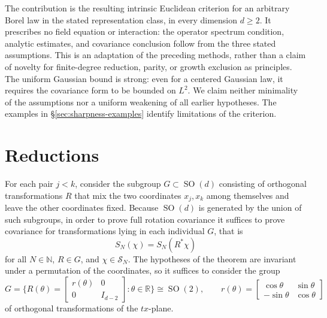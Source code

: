\documentclass[11pt, letterpaper, reqno]{amsart}
\theoremstyle{definition}
\theoremstyle{remark}
\newcommand{\bbN}{\mathbb{N}}
\newcommand{\bbR}{\mathbb{R}}
\newcommand{\calS}{\mathcal{S}}
\begin{document}
The contribution is the resulting intrinsic Euclidean criterion for an
arbitrary Borel law in the stated representation class, in every dimension
$d\geq2$. It prescribes no field equation or interaction: the operator
spectrum condition, analytic estimates, and covariance conclusion follow
from the three stated assumptions. This is an adaptation of the preceding
methods, rather than a claim of novelty for finite-degree reduction,
parity, or growth exclusion as principles. The uniform Gaussian bound is
strong: even for a centered Gaussian law, it requires the covariance form
to be bounded on $L^2$. We claim neither minimality of the assumptions nor
a uniform weakening of all earlier hypotheses. The examples in
\S\ref{sec:sharpness-examples} identify limitations of the criterion.

\section{Reductions}


For each pair $j<k$, consider the subgroup $G\subset \operatorname{SO}(d)$ consisting of orthogonal transformations $R$ that mix the two coordinates $x_j,x_k$ among themselves and leave the other coordinates fixed.
Because $\operatorname{SO}(d)$ is generated by the union of such subgroups, in order to prove full rotation covariance it suffices to prove covariance for transformations lying in each individual $G$, that is
\begin{equation}
    S_N(\chi) = S_N(R^* \chi )
\end{equation}
for all $N\in \bbN$, $R\in G$, and $\chi\in \calS_N$. 
The hypotheses of the theorem are invariant under a permutation of the coordinates, so it suffices to consider the group
\begin{equation}
    G=\Bigg\{  R(\theta) =\begin{bmatrix} 
    r(\theta) & 0 \\
     0 & I_{d-2} 
    \end{bmatrix}  : \theta\in \bbR
    \Bigg\} \cong \operatorname{SO}(2),\qquad  r(\theta) = 
    \begin{bmatrix}
        \cos \theta & \sin \theta \\ 
        -\sin \theta & \cos \theta 
    \end{bmatrix}
\end{equation}
of orthogonal transformations of the $tx$-plane. 
\end{document}
